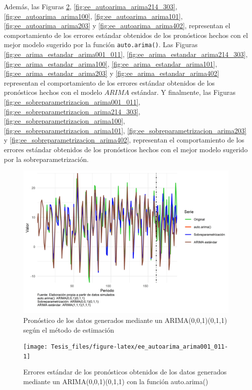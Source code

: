 \documentclass[
]{article}
\begin{document}
Además, las Figuras \ref{fig:ee_autoarima_arima001_011},
\ref{fig:ee_autoarima_arima214_303}, \ref{fig:ee_autoarima_arima100},
\ref{fig:ee_autoarima_arima101}, \ref{fig:ee_autoarima_arima203} y
\ref{fig:ee_autoarima_arima402}, representan el comportamiento de los
errores estándar obtenidos de los pronósticos hechos con el mejor modelo
sugerido por la función \texttt{auto.arima()}. Las Figuras
\ref{fig:ee_arima_estandar_arima001_011},
\ref{fig:ee_arima_estandar_arima214_303},
\ref{fig:ee_arima_estandar_arima100},
\ref{fig:ee_arima_estandar_arima101},
\ref{fig:ee_arima_estandar_arima203} y
\ref{fig:ee_arima_estandar_arima402} representan el comportamiento de
los errores estándar obtenidos de los pronósticos hechos con el modelo
\(ARIMA\) estándar. Y finalmente, las Figuras
\ref{fig:ee_sobreparametrizacion_arima001_011},
\ref{fig:ee_sobreparametrizacion_arima214_303},
\ref{fig:ee_sobreparametrizacion_arima100},
\ref{fig:ee_sobreparametrizacion_arima101},
\ref{fig:ee_sobreparametrizacion_arima203} y
\ref{fig:ee_sobreparametrizacion_arima402}, representan el
comportamiento de los errores estándar obtenidos de los pronósticos
hechos con el mejor modelo sugerido por la sobreparametrización.

\begin{figure}[H]
\includegraphics[width=1\linewidth,height=1\textheight]{Tesis_files/figure-latex/pronostico_arima001_011-1} \caption{Pronóstico de los datos generados mediante un ARIMA(0,0,1)(0,1,1) según el método de estimación}\label{fig:pronostico_arima001_011}
\end{figure}

\begin{figure}[H]
\texttt{[image: Tesis\_files/figure-latex/ee\_autoarima\_arima001\_011-1]} \caption{Errores estándar de los pronósticos obtenidos de los datos generados mediante un ARIMA(0,0,1)(0,1,1) con la función auto.arima()}\label{fig:ee_autoarima_arima001_011}
\end{figure}
\end{document}
